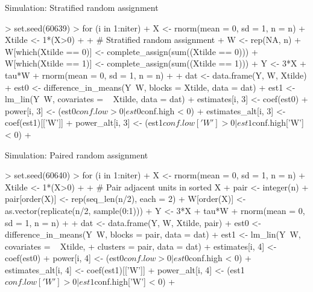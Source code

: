 \documentclass[xcolor={dvipsnames},handout]{beamer}
\begin{document}
\begin{frame}[fragile]{Simulation: Stratified random assignment}
\scriptsize
\begin{Schunk}
\begin{Sinput}
> set.seed(60639)
> for (i in 1:niter) {
+   X <- rnorm(mean = 0, sd = 1, n = n)
+   Xtilde <- 1*(X>0)
+
+   # Stratified random assignment
+   W <- rep(NA, n)
+   W[which(Xtilde == 0)] <-  complete_assign(sum((Xtilde == 0)))
+   W[which(Xtilde == 1)] <-  complete_assign(sum((Xtilde == 1)))
+   Y <- 3*X + tau*W + rnorm(mean = 0, sd = 1, n = n)
+
+   dat <- data.frame(Y, W, Xtilde)
+   est0 <- difference_in_means(Y~W, blocks = Xtilde, data = dat)
+   est1 <- lm_lin(Y~W, covariates = ~ Xtilde, data = dat)
+   estimates[i, 3] <- coef(est0)
+   power[i, 3] <- (est0$conf.low > 0 | est0$conf.high < 0)
+   estimates_alt[i, 3] <- coef(est1)[['W']]
+   power_alt[i, 3] <- (est1$conf.low['W'] > 0 | est1$conf.high['W'] < 0)
+ }
\end{Sinput}
\end{Schunk}
\end{frame}

\begin{frame}[fragile]{Simulation: Paired random assignment}
\scriptsize
\begin{Schunk}
\begin{Sinput}
> set.seed(60640)
> for (i in 1:niter) {
+   X <- rnorm(mean = 0, sd = 1, n = n)
+   Xtilde <- 1*(X>0)
+
+   # Pair adjacent units in sorted X
+   pair <- integer(n)
+   pair[order(X)] <- rep(seq_len(n/2), each = 2)
+   W[order(X)] <- as.vector(replicate(n/2, sample(0:1)))
+   Y <- 3*X + tau*W + rnorm(mean = 0, sd = 1, n = n)
+
+   dat <- data.frame(Y, W, Xtilde, pair)
+   est0 <- difference_in_means(Y~W, blocks = pair, data = dat)
+   est1 <- lm_lin(Y~W, covariates = ~ Xtilde,
+                  clusters = pair, data = dat)
+   estimates[i, 4] <- coef(est0)
+   power[i, 4] <- (est0$conf.low > 0 | est0$conf.high < 0)
+   estimates_alt[i, 4] <- coef(est1)[['W']]
+   power_alt[i, 4] <- (est1$conf.low['W'] > 0 | est1$conf.high['W'] < 0)
+ }
\end{Sinput}
\end{Schunk}
\end{frame}


\end{document}
